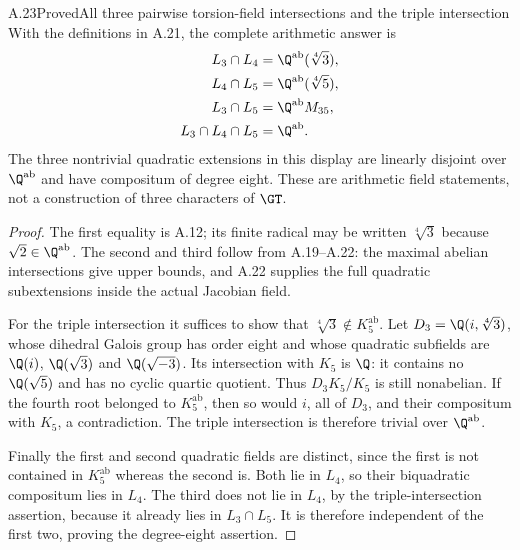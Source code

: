 \begin{statement}{A.23}{Proved}{All three pairwise torsion-field intersections and the triple intersection}
With the definitions in A.21, the complete arithmetic answer is
\[
\begin{aligned}
 L_3\cap L_4&=\Q^{\mathrm{ab}}(\sqrt[4]3),\\
 L_4\cap L_5&=\Q^{\mathrm{ab}}(\sqrt[4]5),\\
 L_3\cap L_5&=\Q^{\mathrm{ab}}M_{35},\\
 L_3\cap L_4\cap L_5&=\Q^{\mathrm{ab}}.
\end{aligned}
\]
The three nontrivial quadratic extensions in this display are
linearly disjoint over $\Q^{\mathrm{ab}}$ and have compositum
of degree eight. These are arithmetic field statements, not a
construction of three characters of $\GT$.
\end{statement}
\begin{proof}
The first equality is A.12; its finite radical may be written
$\sqrt[4]3$ because $\sqrt2\in\Q^{\mathrm{ab}}$.
The second and third follow from A.19--A.22: the maximal
abelian intersections give upper bounds, and A.22 supplies the
full quadratic subextensions inside the actual Jacobian field.

For the triple intersection it suffices to show that
$\sqrt[4]3\notin K_5^{\mathrm{ab}}$. Let
$D_3=\Q(i,\sqrt[4]3)$, whose dihedral Galois group has order
eight and whose quadratic subfields are $\Q(i)$,
$\Q(\sqrt3)$ and $\Q(\sqrt{-3})$.
Its intersection with $K_5$ is $\Q$: it contains no
$\Q(\sqrt5)$ and has no cyclic quartic quotient.
Thus $D_3K_5/K_5$ is still nonabelian. If the fourth root
belonged to $K_5^{\mathrm{ab}}$, then so would $i$, all of
$D_3$, and their compositum with $K_5$, a contradiction.
The triple intersection is therefore trivial over
$\Q^{\mathrm{ab}}$.

Finally the first and second quadratic fields are distinct,
since the first is not contained in $K_5^{\mathrm{ab}}$ whereas
the second is. Both lie in $L_4$, so their biquadratic
compositum lies in $L_4$. The third does not lie in $L_4$,
by the triple-intersection assertion, because it already lies
in $L_3\cap L_5$. It is therefore independent of the first
two, proving the degree-eight assertion.
\end{proof}


